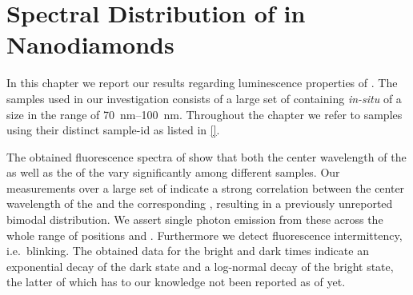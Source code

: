 
\chapter[Spectral Distribution]{Spectral Distribution of \sivs in Nanodiamonds}	\label{ch::distribution}

	In this chapter we report our results regarding luminescence properties of \sivs. The samples used in our investigation consists of a large set of \CVD \nds containing \textit{in-situ} \sivs of a size in the range of \SIrange{70}{100}{\nm}. Throughout the chapter we refer to samples using their distinct sample-id as listed in \cref{}.

	The obtained fluorescence spectra of \sivs show that both the center wavelength of the \ZPL as well as the \lw of the \zpl vary significantly among different samples.
	Our measurements over a large set of \sivs indicate a strong correlation between the center wavelength of the \zpl and the corresponding \lws, resulting in a previously unreported bimodal distribution.
	We assert single photon emission from these \sivs across the whole range of \zpl positions and \lws.
	Furthermore we detect fluorescence intermittency, i.e.\ blinking. The obtained data for the bright and dark times indicate
	an exponential decay of the dark state and a log-normal decay of the bright state, the latter of which has to our knowledge not been reported as of yet.
